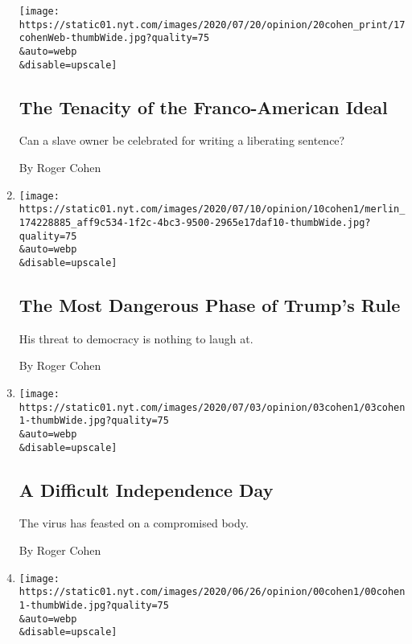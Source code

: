 \begin{enumerate}
  \texttt{[image: https://static01.nyt.com/images/2020/07/20/opinion/20cohen\_print/17cohenWeb-thumbWide.jpg?quality=75\\\&auto=webp\\\&disable=upscale]}

  \hypertarget{the-tenacity-of-the-franco-american-ideal}{%
  \subsection{The Tenacity of the Franco-American
  Ideal}\label{the-tenacity-of-the-franco-american-ideal}}

  Can a slave owner be celebrated for writing a liberating sentence?

  By Roger Cohen
\item
  \href{/2020/07/10/opinion/trump-nationalism.html}{}

  \texttt{[image: https://static01.nyt.com/images/2020/07/10/opinion/10cohen1/merlin\_174228885\_aff9c534-1f2c-4bc3-9500-2965e17daf10-thumbWide.jpg?quality=75\\\&auto=webp\\\&disable=upscale]}

  \hypertarget{the-most-dangerous-phase-of-trumps-rule}{%
  \subsection{The Most Dangerous Phase of Trump's
  Rule}\label{the-most-dangerous-phase-of-trumps-rule}}

  His threat to democracy is nothing to laugh at.

  By Roger Cohen
\item
  \href{/2020/07/02/opinion/july-4th-coronavirus.html}{}

  \texttt{[image: https://static01.nyt.com/images/2020/07/03/opinion/03cohen1/03cohen1-thumbWide.jpg?quality=75\\\&auto=webp\\\&disable=upscale]}

  \hypertarget{a-difficult-independence-day}{%
  \subsection{A Difficult Independence
  Day}\label{a-difficult-independence-day}}

  The virus has feasted on a compromised body.

  By Roger Cohen
\item
  \href{/2020/06/26/opinion/maurice-rooster-france.html}{}

  \texttt{[image: https://static01.nyt.com/images/2020/06/26/opinion/00cohen1/00cohen1-thumbWide.jpg?quality=75\\\&auto=webp\\\&disable=upscale]}


\end{enumerate}
